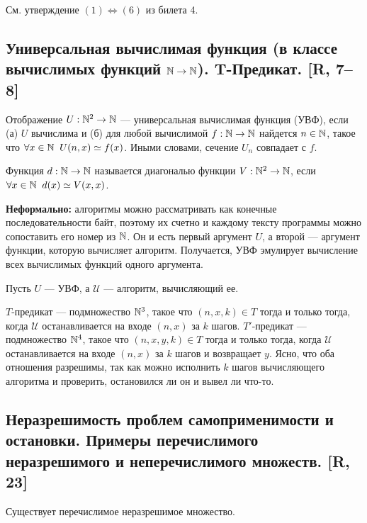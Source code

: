 \documentclass[a4paper, fleqn]{article}
\begin{document}
        См. утверждение $(1) \iff (6)$ из билета 4.

    \subsection{Универсальная вычислимая функция (в классе вычислимых функций $\mathbb{N} \to \mathbb{N}$). T-Предикат. [R, 7–8]}

        \begin{definition}
        Отображение $U : \mathbb{N}^2 \to \mathbb{N}$ --- универсальная вычислимая функция (УВФ), если (а) $U$ вычислима и (б) для любой вычислимой $f : \mathbb{N} \to \mathbb{N}$ найдется $n \in \mathbb{N}$, такое что $\forall x \in \mathbb{N} \;\; U(n, x) \simeq f(x)$. Иными словами, сечение $U_n$ совпадает с $f$.
        \end{definition}

        Функция $d : \mathbb{N} \to \mathbb{N}$ называется диагональю функции $V : \mathbb{N}^2 \to \mathbb{N}$, если $\forall x \in \mathbb{N} \;\; d(x) \simeq V(x, x)$.

        \textbf{Неформально:} алгоритмы можно рассматривать как конечные последовательности байт, поэтому их счетно и каждому тексту программы можно сопоставить его номер из $\mathbb{N}$. Он и есть первый аргумент $U$, а второй --- аргумент функции, которую вычисляет алгоритм. Получается, УВФ эмулирует вычисление всех вычислимых функций одного аргумента.

        Пусть $U$ --- УВФ, а $\mathcal{U}$ --- алгоритм, вычисляющий ее.

        \begin{definition}
        $T$-предикат --- подмножество $\mathbb{N}^3$, такое что $(n, x, k) \in T$ тогда и только тогда, когда $\mathcal{U}$ останавливается на входе $(n, x)$ за $k$ шагов. $T'$-предикат --- подмножество $\mathbb{N}^4$, такое что $(n, x, y, k) \in T$ тогда и только тогда, когда $\mathcal{U}$ останавливается на входе $(n, x)$ за $k$ шагов и возвращает $y$. Ясно, что оба отношения разрешимы, так как можно исполнить $k$ шагов вычисляющего алгоритма и проверить, остановился ли он и вывел ли что-то.
        \end{definition}

    \subsection{Неразрешимость проблем самоприменимости и остановки. Примеры перечислимого неразрешимого и неперечислимого множеств. [R, 23]}

        \begin{proposition}
        Существует перечислимое неразрешимое множество.
        \end{proposition}
\end{document}
